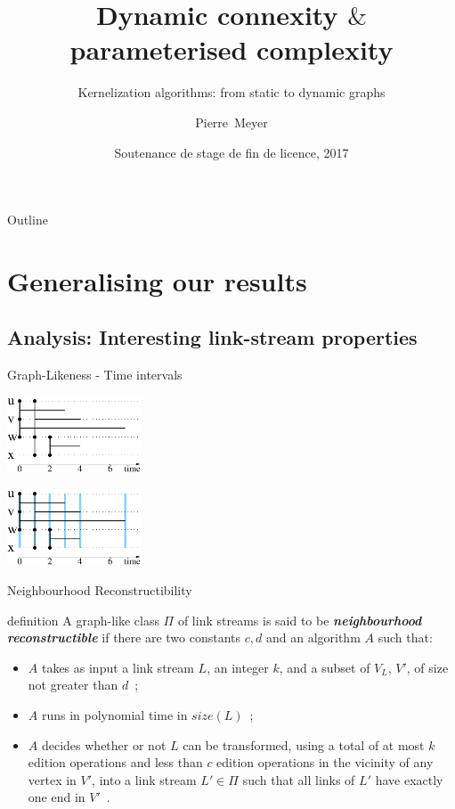 \documentclass{beamer}
\title[Dynamic connexity $\&$ parameterised complexity]
{Dynamic connexity $\&$ parameterised complexity}
\subtitle
{Kernelization algorithms: from static to dynamic graphs}
\author[Meyer]
{Pierre~Meyer}
\institute[Universities of Somewhere and Elsewhere]
{
  Department of Computer Science\\
  Ecole Normale Superieure de Lyon}
\date[SL3 2017]
{Soutenance de stage de fin de licence, 2017}
\begin{document}
\begin{frame}
  \titlepage
\end{frame}

\begin{frame}{Outline}
  \tableofcontents
\end{frame}


\section{Generalising our results}
\subsection{Analysis: Interesting link-stream properties}
\begin{frame}{Graph-Likeness - Time intervals}
  \begin{table}[!h]
    \begin{minipage}{0.4\linewidth}
      \centering
      \includegraphics[width=40mm]{exintervals1.pdf}
    \end{minipage}
    \begin{minipage}{0.4\linewidth}
      \centering
      \includegraphics[width=40mm]{exintervals.pdf}
    \end{minipage}
  \end{table}
\end{frame}
\begin{frame}{Neighbourhood Reconstructibility}
  \begin{block}{definition}
    A graph-like class $\Pi$ of link streams is said to be \emph{\bfseries neighbourhood reconstructible} if there are two constants $c,d$ and an algorithm $A$ such that:
    \begin{itemize}
    \item $A$ takes as input a link stream $L$, an integer $k$, and a subset of $V_L$, $V'$, of size not greater than $d$~;
    \item $A$ runs in polynomial time in $size(L)$~;
    \item $A$ decides whether or not $L$ can be transformed, using a total of at most $k$ edition operations and less than $c$ edition operations in the vicinity of any vertex in $V'$, into a link stream $L'\in \Pi$ such that all links of $L'$ have exactly one end in $V'$~.
    \end{itemize}
  \end{block}
\end{frame}
\end{document}
